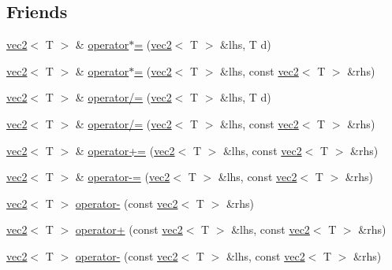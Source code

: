 \subsection*{Friends}
\begin{CompactItemize}
\item 
\hyperlink{classnv_1_1vec2}{vec2}$<$ T $>$ \& \hyperlink{classnv_1_1vec2_216e425b7f6b4ba8fc4846b251e4fb19}{operator$\ast$=} (\hyperlink{classnv_1_1vec2}{vec2}$<$ T $>$ \&lhs, T d)
\item 
\hyperlink{classnv_1_1vec2}{vec2}$<$ T $>$ \& \hyperlink{classnv_1_1vec2_cfb5953131392ae2ff24e5b9818e7bff}{operator$\ast$=} (\hyperlink{classnv_1_1vec2}{vec2}$<$ T $>$ \&lhs, const \hyperlink{classnv_1_1vec2}{vec2}$<$ T $>$ \&rhs)
\item 
\hyperlink{classnv_1_1vec2}{vec2}$<$ T $>$ \& \hyperlink{classnv_1_1vec2_e4010436401845819ae1c987802d08a7}{operator/=} (\hyperlink{classnv_1_1vec2}{vec2}$<$ T $>$ \&lhs, T d)
\item 
\hyperlink{classnv_1_1vec2}{vec2}$<$ T $>$ \& \hyperlink{classnv_1_1vec2_3939b33baf1bb44242757a4b91ffacdd}{operator/=} (\hyperlink{classnv_1_1vec2}{vec2}$<$ T $>$ \&lhs, const \hyperlink{classnv_1_1vec2}{vec2}$<$ T $>$ \&rhs)
\item 
\hyperlink{classnv_1_1vec2}{vec2}$<$ T $>$ \& \hyperlink{classnv_1_1vec2_3af35a75e3ae9f9dddad0fc21747b856}{operator+=} (\hyperlink{classnv_1_1vec2}{vec2}$<$ T $>$ \&lhs, const \hyperlink{classnv_1_1vec2}{vec2}$<$ T $>$ \&rhs)
\item 
\hyperlink{classnv_1_1vec2}{vec2}$<$ T $>$ \& \hyperlink{classnv_1_1vec2_9cffe2e7d8b3f0754685b3d1044471a7}{operator-=} (\hyperlink{classnv_1_1vec2}{vec2}$<$ T $>$ \&lhs, const \hyperlink{classnv_1_1vec2}{vec2}$<$ T $>$ \&rhs)
\item 
\hyperlink{classnv_1_1vec2}{vec2}$<$ T $>$ \hyperlink{classnv_1_1vec2_859a796ad57c02d570c28e4cb3f11c1b}{operator-} (const \hyperlink{classnv_1_1vec2}{vec2}$<$ T $>$ \&rhs)
\item 
\hyperlink{classnv_1_1vec2}{vec2}$<$ T $>$ \hyperlink{classnv_1_1vec2_e9e8351f127155cf29c8afd8330b005f}{operator+} (const \hyperlink{classnv_1_1vec2}{vec2}$<$ T $>$ \&lhs, const \hyperlink{classnv_1_1vec2}{vec2}$<$ T $>$ \&rhs)
\item 
\hyperlink{classnv_1_1vec2}{vec2}$<$ T $>$ \hyperlink{classnv_1_1vec2_da5e7f01644574eac325648f2f25670c}{operator-} (const \hyperlink{classnv_1_1vec2}{vec2}$<$ T $>$ \&lhs, const \hyperlink{classnv_1_1vec2}{vec2}$<$ T $>$ \&rhs)
\item 

\end{CompactItemize}
